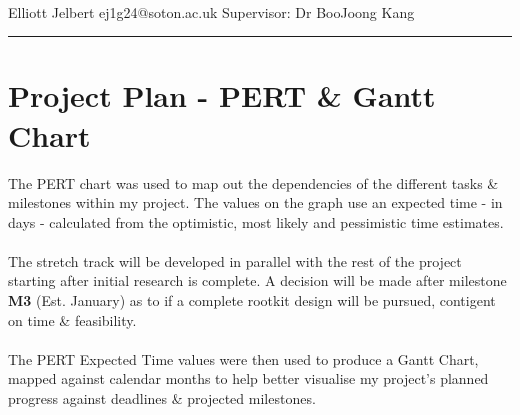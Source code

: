 \documentclass[10pt, a4paper]{article} %
\date{}
\begin{document}


\\[10pt]
{\small Elliott Jelbert \quad ej1g24@soton.ac.uk \quad Supervisor: Dr BooJoong Kang}
\vspace{15pt}
\hrule

\section*{Project Plan - PERT \& Gantt Chart}
The PERT chart was used to map out the dependencies of the different tasks \& milestones within my project. The values on the graph use
an expected time - in days - calculated from the optimistic, most likely and pessimistic time estimates.  \\  \\  
The stretch track will be developed in parallel with the rest of the project starting after initial research is complete. A decision will be made after milestone \textbf{M3} (Est. January) as to if a complete rootkit design will be pursued, contigent on time \& feasibility. \\ \\
The PERT Expected Time values were then used to produce a Gantt Chart, mapped against calendar months to help better visualise my project's planned progress against deadlines \& projected milestones.
\end{document}

